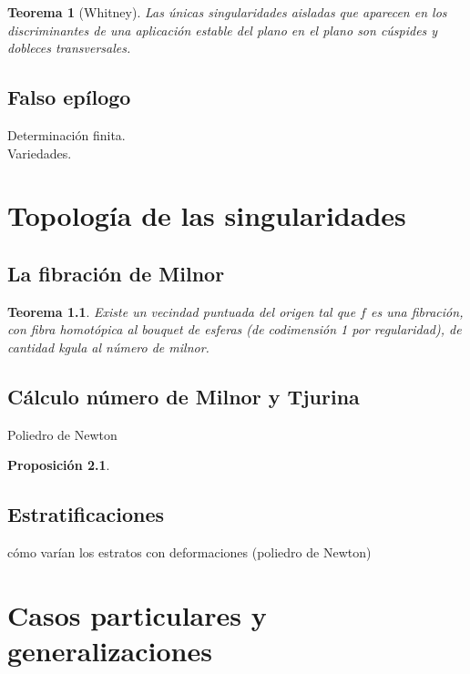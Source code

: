 \documentclass[12pt]{book}
\newtheorem{teo}{Teorema}
\newtheorem{pro}{Proposición}
\begin{document}
\begin{teo}[Whitney]
Las únicas singularidades aisladas que aparecen en los discriminantes de una aplicación estable del plano en el plano son cúspides y dobleces transversales.
\end{teo}





\chapter{Falso epílogo}

Determinación finita.\\
Variedades.



\part{Topología de las singularidades}

\chapter{La fibración de Milnor}

\begin{teo}
Existe un vecindad puntuada del origen tal que $f$ es una fibración, con fibra homotópica al bouquet de esferas (de codimensión 1 por regularidad), de cantidad kgula al número de milnor.
\end{teo}
	
\chapter{Cálculo número de Milnor y  Tjurina}
Poliedro de Newton	

\begin{pro}

\end{pro}

	
\chapter{Estratificaciones}

cómo varían los estratos con deformaciones (poliedro de Newton)

	
	
	
\part{Casos particulares y generalizaciones}	
	
\end{document}
